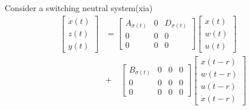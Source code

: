 \documentclass[twocolumn]{autart}    %
\begin{document}
\begin{exmp}
\end{exmp}

\begin{exmp}
    Consider a switching neutral system(xia)
    \begin{equation}
        \begin{aligned}
            \begin{bmatrix}
                \dot{x}(t) \\
                z(t) \\
                y(t) 
            \end{bmatrix} &=\begin{bmatrix}
                A_{\sigma(t)} & 0 & D_{\sigma(t)}\\
                0 & 0 & 0\\
                0 & 0 & 0
            \end{bmatrix}\begin{bmatrix}
                x(t) \\
                w(t) \\
                u(t) 
            \end{bmatrix} \\ 
            &+ \quad \begin{bmatrix}
                B_{\sigma(t)} & 0 & 0 & 0\\
                0 & 0 & 0 & 0\\
                0 & 0 & 0 & 0
            \end{bmatrix} \begin{bmatrix}
                x(t-r) \\
                w(t-r) \\
                u(t-r) \\
                \dot{x}(t-r)

\end{bmatrix}
\end{aligned}
\end{equation}
\end{exmp}
\end{document}
